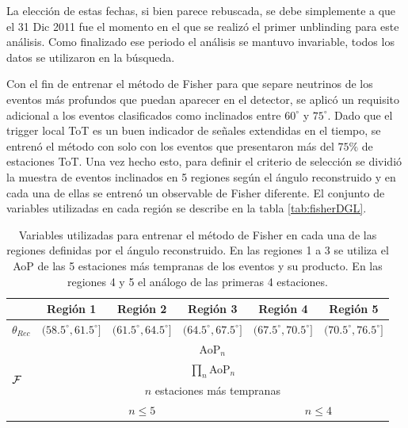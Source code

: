 	La elección de estas fechas, si bien parece rebuscada, se debe simplemente a que el 31 Dic 2011 fue el momento en el que se realizó el primer unblinding para este análisis.
	Como finalizado ese periodo el análisis se mantuvo invariable, todos los datos se utilizaron en la búsqueda.
	
	Con el fin de entrenar el método de Fisher para que separe neutrinos de los eventos más profundos que puedan aparecer en el detector, se aplicó un requisito adicional a los eventos clasificados como inclinados entre $60^\circ$ y $75^\circ$.
	Dado que el trigger local ToT es un buen indicador de señales extendidas en el tiempo, se entrenó el método con solo con los eventos que presentaron más del $75\%$ de estaciones ToT.
	Una vez hecho esto, para definir el criterio de selección se dividió la muestra de eventos inclinados en 5 regiones según el ángulo reconstruido y en cada una de ellas se entrenó un observable de Fisher diferente.
	El conjunto de variables utilizadas en cada región se describe en la tabla \ref{tab:fisherDGL}. 
	\begin{table}[h!]
		\begin{center}
		\renewcommand{\arraystretch}{1.4}
		\footnotesize
			\begin{tabular}{|l|c|c|c|c|c|}
			\hline
			& Región 1 & Región 2 & Región 3 & Región 4 & Región 5 \\
			\hline
			$\theta_{Rec}$ & $(58.5^\circ,61.5^\circ]$ & $(61.5^\circ,64.5^\circ]$ &$(64.5^\circ,67.5^\circ]$ &$(67.5^\circ,70.5^\circ]$ & $(70.5^\circ,76.5^\circ]$ \\
			\hline
			\multirow{4}{*}{$\cal{F}$}  & \multicolumn{5}{c|}{AoP$_n$} \\
			                 & \multicolumn{5}{c|}{$\prod_n$AoP$_n$} \\
			                 & \multicolumn{5}{c|}{$n$ estaciones más tempranas} \\
			                 & \multicolumn{3}{c|}{$n\leq5$} & \multicolumn{2}{c|}{$n\leq4$} \\
			\hline
			\end{tabular}
			\caption{Variables utilizadas para entrenar el método de Fisher en cada una de las regiones definidas por el ángulo reconstruido. En las regiones 1 a 3 se utiliza el AoP de las 5 estaciones más tempranas de los eventos y su producto. En las regiones 4 y 5 el análogo de las primeras 4 estaciones.}
		\end{center}	 
	\end{table}
	
